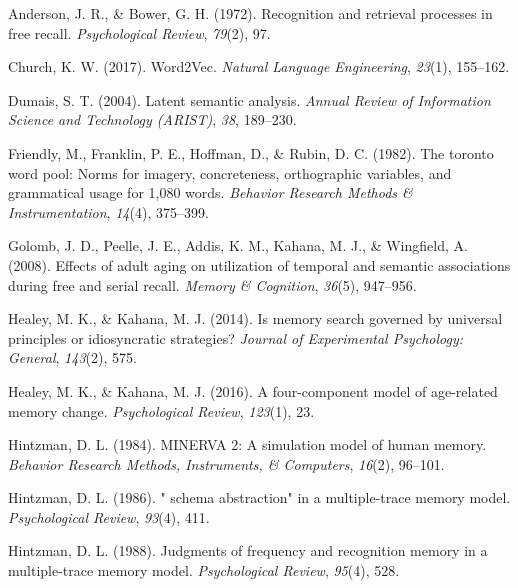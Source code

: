 \documentclass[
  letterpaper,
  DIV=11,
  numbers=noendperiod]{scrreport}
\newlength{\cslhangindent}
\newlength{\cslentryspacingunit} %
\newenvironment{CSLReferences}[2] %
 {%
  \setlength{\parindent}{0pt}
  \ifodd #1
  \let\oldpar\par
  \def\par{\hangindent=\cslhangindent\oldpar}
  \fi
  \setlength{\parskip}{#2\cslentryspacingunit}
 }%
 {}
\begin{document}
\hypertarget{refs}{}
\begin{CSLReferences}{1}{0}
\leavevmode{}%
Anderson, J. R., \& Bower, G. H. (1972). Recognition and retrieval
processes in free recall. \emph{Psychological Review}, \emph{79}(2), 97.

\leavevmode{}%
Church, K. W. (2017). Word2Vec. \emph{Natural Language Engineering},
\emph{23}(1), 155--162.

\leavevmode{}%
Dumais, S. T. (2004). Latent semantic analysis. \emph{Annual Review of
Information Science and Technology (ARIST)}, \emph{38}, 189--230.

\leavevmode{}%
Friendly, M., Franklin, P. E., Hoffman, D., \& Rubin, D. C. (1982). The
toronto word pool: Norms for imagery, concreteness, orthographic
variables, and grammatical usage for 1,080 words. \emph{Behavior
Research Methods \& Instrumentation}, \emph{14}(4), 375--399.

\leavevmode{}%
Golomb, J. D., Peelle, J. E., Addis, K. M., Kahana, M. J., \& Wingfield,
A. (2008). Effects of adult aging on utilization of temporal and
semantic associations during free and serial recall. \emph{Memory \&
Cognition}, \emph{36}(5), 947--956.

\leavevmode{}%
Healey, M. K., \& Kahana, M. J. (2014). Is memory search governed by
universal principles or idiosyncratic strategies? \emph{Journal of
Experimental Psychology: General}, \emph{143}(2), 575.

\leavevmode{}%
Healey, M. K., \& Kahana, M. J. (2016). A four-component model of
age-related memory change. \emph{Psychological Review}, \emph{123}(1),
23.

\leavevmode{}%
Hintzman, D. L. (1984). MINERVA 2: A simulation model of human memory.
\emph{Behavior Research Methods, Instruments, \& Computers},
\emph{16}(2), 96--101.

\leavevmode{}%
Hintzman, D. L. (1986). " schema abstraction" in a multiple-trace memory
model. \emph{Psychological Review}, \emph{93}(4), 411.

\leavevmode{}%
Hintzman, D. L. (1988). Judgments of frequency and recognition memory in
a multiple-trace memory model. \emph{Psychological Review},
\emph{95}(4), 528.


\end{CSLReferences}
\end{document}
